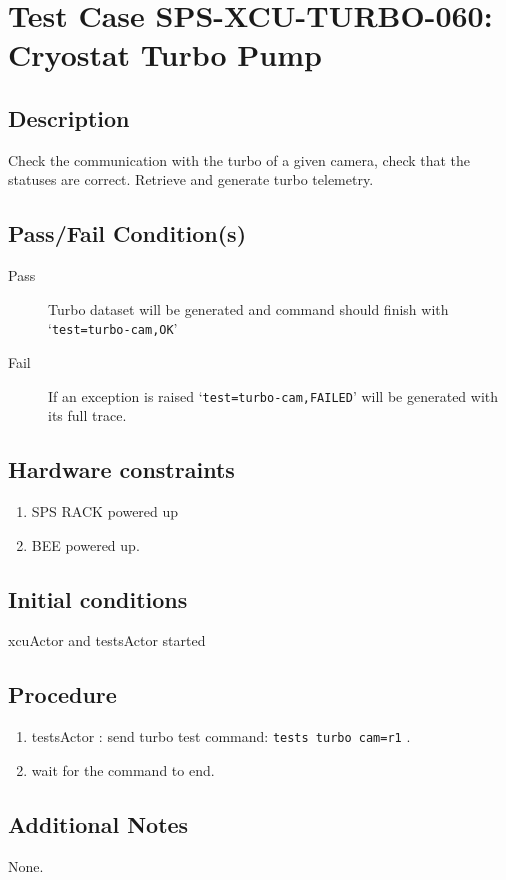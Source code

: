 \section{Test Case SPS-XCU-TURBO-060: Cryostat Turbo Pump}

\subsection{Description}

Check the communication with the turbo of a given camera, check that the statuses are correct.
Retrieve and generate turbo telemetry.

\subsection{Pass/Fail Condition(s)}

\begin{description}
\item [Pass] Turbo dataset will be generated and command should finish with `\texttt{test=turbo-cam,OK}'
\item [Fail] If an exception is raised `\texttt{test=turbo-cam,FAILED}' will be generated with its full trace.

\end{description}

\subsection{Hardware constraints}

\begin{enumerate}
    \item SPS RACK powered up
    \item \acrshort{BEE} powered up.
\end{enumerate}

\subsection{Initial conditions}

xcuActor and testsActor started

\subsection{Procedure}

\begin{enumerate}
    \item testsActor : send turbo test command: \texttt{tests turbo cam=r1} .
    \item wait for the command to end.
\end{enumerate}

\subsection{Additional Notes}
None.
